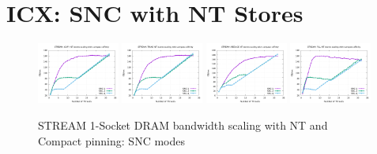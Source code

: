 \documentclass{article}
\begin{document}
\clearpage
\section{ICX: SNC with NT Stores}
\begin{figure}[!ht]
    \centering
    \includegraphics[width=0.24\textwidth]{../data/icx-32c-snc/mem_bw_scale/mb_scale_compact_Copy_nt}
    \includegraphics[width=0.24\textwidth]{../data/icx-32c-snc/mem_bw_scale/mb_scale_compact_Triad_nt}
    \includegraphics[width=0.24\textwidth]{../data/icx-32c-snc/mem_bw_scale/mb_scale_compact_Reduce_nt}
    \includegraphics[width=0.24\textwidth]{../data/icx-32c-snc/mem_bw_scale/mb_scale_compact_Fill_nt}
    \caption{STREAM 1-Socket DRAM bandwidth scaling with NT and Compact pinning: SNC modes}
    \label{figure:mem_bw_scale_compact_NT_icx_snc}
\end{figure}
\end{document}
